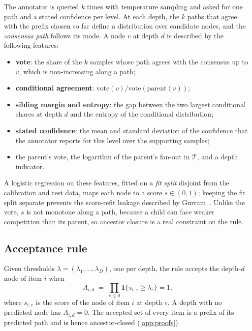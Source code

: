 \documentclass[preprint,12pt]{elsarticle}
\theoremstyle{definition}
\begin{document}
The annotator is queried $k$ times with temperature sampling and asked for one
path and a stated confidence per level. At each depth, the $k$ paths that agree
with the prefix chosen so far define a distribution over candidate nodes, and
the \emph{consensus path} follows its mode. A node $v$ at depth $d$ is described
by the following features:
\begin{itemize}
  \item \textbf{vote}: the share of the $k$ samples whose path agrees with the
  consensus up to $v$, which is non-increasing along a path;
  \item \textbf{conditional agreement}: $\mathrm{vote}(v)/\mathrm{vote}(\mathrm{parent}(v))$;
  \item \textbf{sibling margin and entropy}: the gap between the two largest
  conditional shares at depth $d$ and the entropy of the conditional
  distribution;
  \item \textbf{stated confidence}: the mean and standard deviation of the
  confidence that the annotator reports for this level over the supporting
  samples;
  \item the parent's vote, the logarithm of the parent's fan-out in
  $\mathcal{T}$, and a depth indicator.
\end{itemize}
A logistic regression on these features, fitted on a \emph{fit split} disjoint
from the calibration and test data, maps each node to a score $s\in(0,1)$;
keeping the fit split separate prevents the score-refit leakage described by
Gurram~\cite{gurram2026perfield}. Unlike the vote, $s$ is not monotone along a
path, because a child can face weaker competition than its parent, so ancestor
closure is a real constraint on the rule.

\subsection{Acceptance rule}
\label{sec:method-rule}

Given thresholds $\lambda=(\lambda_1,\dots,\lambda_D)$, one per depth, the rule
accepts the depth-$d$ node of item $i$ when
\begin{equation}
  A_{i,d} \;=\; \prod_{e\le d}\mathbf{1}\{s_{i,e}\ge\lambda_e\}=1,
  \label{eq:rule}
\end{equation}
where $s_{i,e}$ is the score of the node of item $i$ at depth $e$. A depth with no predicted node has $A_{i,d}=0$. The accepted
set of every item is a prefix of its predicted path and is hence
ancestor-closed (\ref{app:proofs}).
\end{document}
